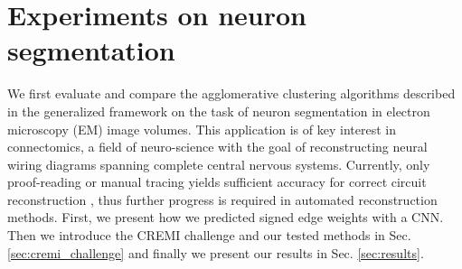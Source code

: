 


\section{Experiments on neuron segmentation}\label{sec:neuro_segm_exp}

We first evaluate and compare the agglomerative clustering algorithms described in the generalized framework on the task of neuron segmentation in electron microscopy (EM) image volumes. This application is of key interest in connectomics, a field of neuro-science with the goal of reconstructing neural wiring diagrams spanning complete central nervous systems. Currently, only proof-reading or manual tracing yields sufficient accuracy for correct circuit reconstruction \cite{schlegel2017learning}, thus further progress is required in automated reconstruction methods.
First, we present how we predicted signed edge weights with a CNN. Then we introduce the CREMI challenge and our tested methods in Sec. \ref{sec:cremi_challenge} and finally we present our results in Sec. \ref{sec:results}.

